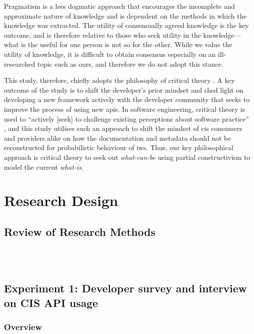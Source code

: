 Pragmatism is a less dogmatic approach that encourages the incomplete and approximate nature of knowledge and is dependent on the methods in which the knowledge was extracted. The utility of consensually agreed knowledge is the key outcome, and is therefore relative to those who seek utility in the knowledge---what is the useful for one person is not so for the other. While we value the utility of knowledge, it is difficult to obtain consensus especially on an ill-researched topic such as ours, and therefore we do not adopt this stance.

This study, therefore, chiefly adopts the philosophy of critical theory . A key outcome of the study is to shift the developer's prior mindset and shed light on developing a new framework actively with the developer community that seeks to improve the process of using new \glspl{api}. In software engineering, critical theory is used to ``actively [seek] to challenge existing perceptions about software practice'' \citep{Easterbrook:2007ws}, and this study utilises such an approach to shift the mindset of \gls{cis} consumers and providers alike on how the documentation and metadata should not be reconstructed for probabilistic behaviour of \gls{iws}. Thus, our key philosophical approach is critical theory to seek out \textit{what-can-be} using  partial constructivism to model the current \textit{what-is}.

\section{Research Design}

\subsection{Review of Research Methods}

\\
\\

\subsection{Experiment 1: Developer survey and interview on CIS API usage}

\subsubsection{Overview}

